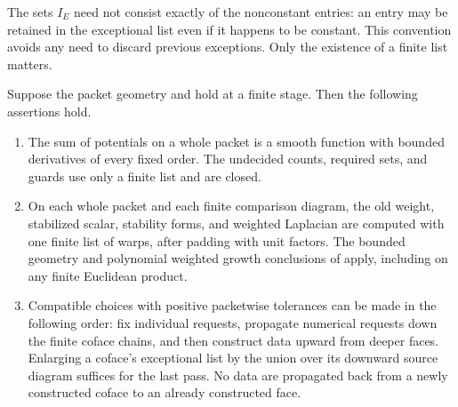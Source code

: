 The sets $I_E$ need not consist exactly of the nonconstant entries: an
entry may be retained in the exceptional list even if it happens to be
constant. This convention avoids any need to discard previous exceptions.
Only the existence of a finite list matters.

\begin{lemma}\label{countable:locality}
Suppose the packet geometry and  hold at a
finite stage. Then the following assertions hold.
\begin{enumerate}[label=(\roman*),leftmargin=*]
\item The sum of potentials on a whole packet is a smooth function
with bounded derivatives of every fixed order. The undecided counts,
required sets, and guards use only a finite list and are closed.
\item On each whole packet and each finite comparison diagram, the old
weight, stabilized scalar, stability forms, and weighted Laplacian are
computed with one finite list of warps, after padding with unit factors.
The bounded geometry and polynomial weighted growth conclusions of
 apply, including on any finite Euclidean product.
\item Compatible choices with positive packetwise tolerances can be
made in the following order: fix individual requests, propagate numerical
requests down the finite coface chains, and then construct data upward
from deeper faces. Enlarging a coface's exceptional list by the union
over its downward source diagram suffices for the last pass. No data
are propagated back from a newly constructed coface to an already
constructed face.
\end{enumerate}
\end{lemma}

